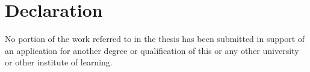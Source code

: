 \chapter{Declaration}

No portion of the work referred to in the thesis has been submitted in support 
of an application for another degree or qualification of this or any other 
university or other institute of learning.
